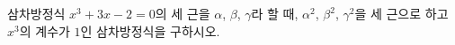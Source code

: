 삼차방정식 $x^3+3x-2=0$의 세 근을 $\alpha$, $\beta$, $\gamma$라 할 때, $\alpha^2$, $\beta^2$, $\gamma^2$을 세 근으로 하고 $x^3$의 계수가 $1$인 삼차방정식을 구하시오.
